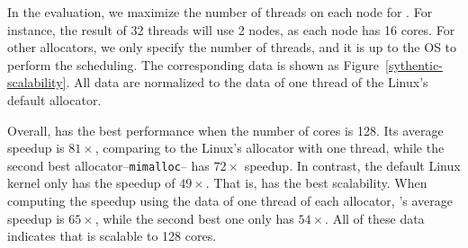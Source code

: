 In the evaluation, we maximize the number of threads on each node for \NM{}. For instance, the result of 32 threads will use 2 nodes, as each node has 16 cores. For other allocators, we only specify the number of threads, and it is up to the OS to perform the scheduling. The corresponding data is shown as Figure~\ref{sythentic-scalability}. All data are normalized to the data of one thread of the Linux's default allocator. 

Overall, \NM{} has the best performance when the number of cores is 128. Its average speedup is $81\times$, comparing to the Linux's allocator with one thread, while the second best allocator--\texttt{mimalloc}-- has $72\times$ speedup. In contrast, the default Linux kernel only has the speedup of $49\times$. That is, \NM{} has the best scalability. When computing the speedup using the data of one thread of each allocator, \NM{}'s average speedup is $65\times$, while the second best one only has $54\times$. All of these data indicates that \NM{} is scalable to 128 cores. 





